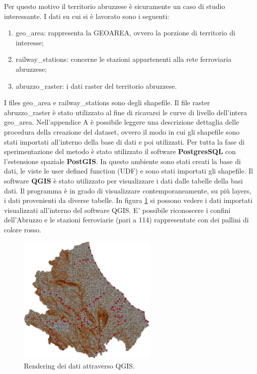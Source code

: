 Per questo motivo il territorio abruzzese è sicuramente un caso di studio interessante.
I dati su cui si è lavorato sono i seguenti:
\begin{enumerate}
	\item geo\_area: rappresenta la GEOAREA, ovvero la porzione di territorio di interesse;
	\item railway\_stations: concerne le stazioni appartenenti alla rete ferroviaria abruzzese;
	\item abruzzo\_raster: i dati raster del territorio abruzzese.
\end{enumerate}
I files geo\_area e railway\_stations  sono degli shapefile. Il file raster abruzzo\_raster è stato utilizzato al fine di ricavarsi le curve di livello dell'intera geo\_area. Nell'appendice A è possibile leggere una descrizione dettaglia delle procedura della creazione del dataset, ovvero il modo in cui gli shapefile sono stati importati all'interno della base di dati e poi utilizzati.
Per tutta la fase di sperimentazione del metodo è stato utilizzato il software \textbf{PostgresSQL} con l’estensione spaziale \textbf{PostGIS}. In questo ambiente sono stati creati la base di dati, le viste le user defined function (UDF) e sono stati importati gli shapefile. Il software \textbf{QGIS} è stato utilizzato per visualizzare i dati dalle tabelle della basi dati. Il programma è in grado di visualizzare contemporaneamente, su più layers, i dati provenienti da diverse tabelle. In figura \ref{qgis} si possono vedere i dati importati visualizzati all'interno del software QGIS. E' possibile riconoscere i confini dell'Abruzzo e le stazioni ferroviarie (pari a 114) rappresentate con dei pallini di colore rosso.

\begin{figure}[h]
	\centering
	\includegraphics[width=0.6\textwidth]{images/dati_abruzzo_stazione}
	\caption{Rendering dei dati attraverso QGIS.}
	\label{qgis}
\end{figure}

